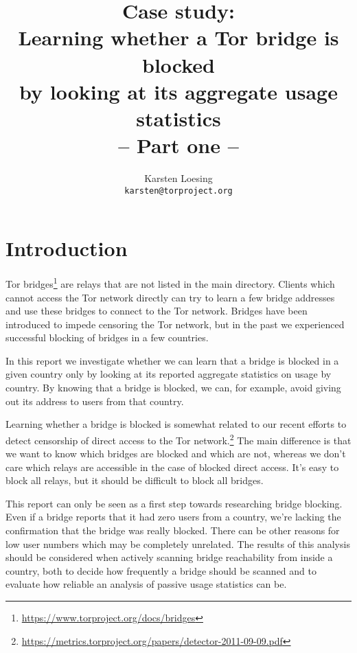 \documentclass{article}
\begin{document}
\author{Karsten Loesing\\{\tt karsten@torproject.org}}
\title{Case study:\\Learning whether a Tor bridge is blocked\\by looking
at its aggregate usage statistics\\-- Part one --}
\maketitle

\section{Introduction}

Tor bridges\footnote{\url{https://www.torproject.org/docs/bridges}} are
relays that are not listed in the main directory.
Clients which cannot access the Tor network directly can try to learn a
few bridge addresses and use these bridges to connect to the Tor network.
Bridges have been introduced to impede censoring the Tor network, but in
the past we experienced successful blocking of bridges in a few countries.

In this report we investigate whether we can learn that a bridge is
blocked in a given country only by looking at its reported aggregate
statistics on usage by country.
By knowing that a bridge is blocked, we can, for example, avoid giving
out its address to users from that country.

Learning whether a bridge is blocked is somewhat related to our recent
efforts to detect censorship of direct access to the Tor
network.\footnote{\url{https://metrics.torproject.org/papers/detector-2011-09-09.pdf}}
The main difference is that we want to know which bridges are blocked and
which are not, whereas we don't care which relays are accessible in the
case of blocked direct access.
It's easy to block all relays, but it should be difficult to block all
bridges.

This report can only be seen as a first step towards researching bridge
blocking.
Even if a bridge reports that it had zero users from a country, we're
lacking the confirmation that the bridge was really blocked.
There can be other reasons for low user numbers which may be completely
unrelated.
The results of this analysis should be considered when actively scanning
bridge reachability from inside a country, both to decide how frequently a
bridge should be scanned and to evaluate how reliable an analysis of
passive usage statistics can be.
\end{document}
